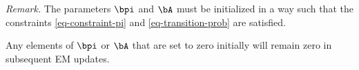\documentclass[12pt]{article}
\begin{document}
\begin{enumerate}[label=\textbf{\arabic*.}]
	\textit{Remark.} The parameters $\bpi$ and $\bA$ must be initialized in a way such that the constraints \eqref{eq-constraint-pi} and \eqref{eq-transition-prob} are satisfied. 
	
	Any elements of $\bpi$ or $\bA$ that are set to zero initially will remain zero in subsequent EM updates. 
	
%	

\end{enumerate}
\end{document}
